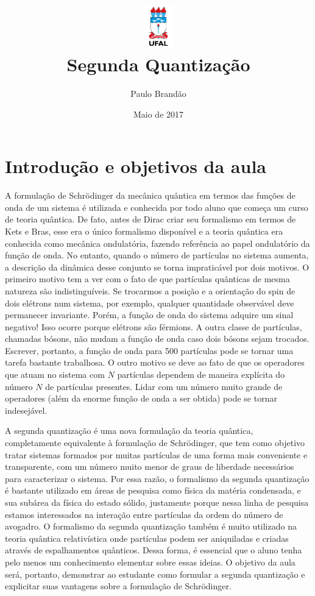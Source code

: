 \documentclass{article}
\title{\includegraphics[width=0.1\textwidth]{ufallogo.png} \\
\Huge{\color{astral}\textbf{Segunda Quantização}}}
\author{Paulo Brandão}
\date{Maio de 2017}
\begin{document}
\maketitle


\section{Introdução e objetivos da aula}

A formulação de Schrödinger da mecânica quântica em termos das funções de onda de um sistema é utilizada e conhecida por todo aluno que começa um curso de teoria quântica. De fato, antes de Dirac criar seu formalismo em termos de Kets e Bras, esse era o único formalismo disponível e a teoria quântica era conhecida como mecânica ondulatória, fazendo referência ao papel ondulatório da função de onda. No entanto, quando o número de partículas no sistema aumenta, a descrição da dinâmica desse conjunto se torna impraticável por dois motivos. O primeiro motivo tem a ver com o fato de que partículas quânticas de mesma natureza são indistinguíveis. Se trocarmos a posição e a orientação do spin de dois elétrons num sistema, por exemplo, qualquer quantidade observável deve permanecer invariante. Porém, a função de onda do sistema adquire um sinal negativo! Isso ocorre porque elétrons são férmions. A outra classe de partículas, chamadas bósons, não mudam a função de onda caso dois bósons sejam trocados. Escrever, portanto, a função de onda para 500 partículas pode se tornar uma tarefa bastante trabalhosa. O outro motivo se deve ao fato de que os operadores que atuam no sistema com $N$ partículas dependem de maneira explícita do número $N$ de partículas presentes. Lidar com um número muito grande de operadores (além da enorme função de onda a ser obtida) pode se tornar indesejável.

A segunda quantização é uma nova formulação da teoria quântica, completamente equivalente à formulação de Schrödinger, que tem como objetivo tratar sistemas formados por muitas partículas de uma forma mais conveniente e transparente, com um número muito menor de graus de liberdade necessários para caracterizar o sistema. Por essa razão, o formalismo da segunda quantização é bastante utilizado em áreas de pesquisa como física da matéria condensada, e sua subárea da física do estado sólido, justamente porque nessa linha de pesquisa estamos interessados na interação entre partículas da ordem do número de avogadro. O formalismo da segunda quantização também é muito utilizado na teoria quântica relativística onde partículas podem ser aniquiladas e criadas através de espalhamentos quânticos. Dessa forma, é essencial que o aluno tenha pelo menos um conhecimento elementar sobre essas ideias. O objetivo da aula será, portanto, demonstrar ao estudante como formular a segunda quantização e explicitar suas vantagens sobre a formulação de Schrödinger.
\end{document}
